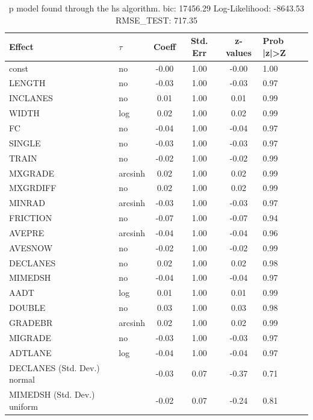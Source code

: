 \begin{table}
	\caption{p model found through the hs algorithm. bic: 17456.29 Log-Likelihood: -8643.53 RMSE_TEST: 717.35}
	\begin{center}
		\begin{tabular}{|l|l|c|c|c|l|}
			\hline
			Effect & $\tau$ & Coeff & Std. Err & z-values & Prob |z|>Z \\
			\hline
			const & no & -0.00 & 1.00 & -0.00 & 1.00 \\
			\hline
			LENGTH & no & -0.03 & 1.00 & -0.03 & 0.97 \\
			\hline
			INCLANES & no & 0.01 & 1.00 & 0.01 & 0.99 \\
			\hline
			WIDTH & log & 0.02 & 1.00 & 0.02 & 0.99 \\
			\hline
			FC & no & -0.04 & 1.00 & -0.04 & 0.97 \\
			\hline
			SINGLE & no & -0.03 & 1.00 & -0.03 & 0.97 \\
			\hline
			TRAIN & no & -0.02 & 1.00 & -0.02 & 0.99 \\
			\hline
			MXGRADE & arcsinh & 0.02 & 1.00 & 0.02 & 0.99 \\
			\hline
			MXGRDIFF & no & 0.02 & 1.00 & 0.02 & 0.99 \\
			\hline
			MINRAD & arcsinh & -0.03 & 1.00 & -0.03 & 0.97 \\
			\hline
			FRICTION & no & -0.07 & 1.00 & -0.07 & 0.94 \\
			\hline
			AVEPRE & arcsinh & -0.04 & 1.00 & -0.04 & 0.96 \\
			\hline
			AVESNOW & no & -0.02 & 1.00 & -0.02 & 0.99 \\
			\hline
			DECLANES & no & 0.02 & 1.00 & 0.02 & 0.98 \\
			\hline
			MIMEDSH & no & -0.04 & 1.00 & -0.04 & 0.97 \\
			\hline
			AADT & log & 0.01 & 1.00 & 0.01 & 0.99 \\
			\hline
			DOUBLE & no & 0.03 & 1.00 & 0.03 & 0.98 \\
			\hline
			GRADEBR & arcsinh & 0.02 & 1.00 & 0.02 & 0.99 \\
			\hline
			MIGRADE & no & -0.03 & 1.00 & -0.03 & 0.97 \\
			\hline
			ADTLANE & log & -0.04 & 1.00 & -0.04 & 0.97 \\
			\hline
			DECLANES (Std. Dev.) normal &  & -0.03 & 0.07 & -0.37 & 0.71 \\
			\hline
			MIMEDSH (Std. Dev.) uniform &  & -0.02 & 0.07 & -0.24 & 0.81 \\

\end{tabular}
\end{center}
\end{table}
